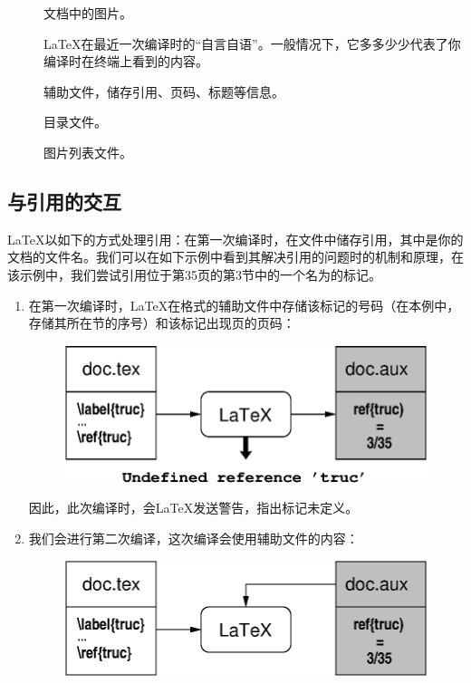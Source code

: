 \begin{description}
  \item[] 文档中的图片。
  \item[] \LaTeX 在最近一次编译时的“自言自语”。一般情况下，它多多少少代表了你编译时在终端上看到的内容。
  \item[] 辅助文件，储存引用、页码、标题等信息。
  \item[] 目录文件。
  \item[] 图片列表文件。
\end{description}

\subsection{与引用的交互}

\LaTeX 以如下的方式处理引用：在第一次编译时，在文件中储存引用，其中是你的文档的文件名。我们可以在如下示例中看到其解决引用的问题时的机制和原理，在该示例中，我们尝试引用位于第35页的第3节中的一个名为的标记。

\begin{enumerate}
  \item 在第一次编译时，\LaTeX 在格式的辅助文件中存储该标记的号码（在本例中，存储其所在节的序号）和该标记出现页的页码：
  
  \begin{figure}[ht]
    \begin{center}
      \includegraphics{img/ref1.eps}
    \end{center}
  \end{figure}

  因此，此次编译时，会\LaTeX 发送警告，指出标记未定义。
  \item 我们会进行第二次编译，这次编译会使用辅助文件的内容：
  \begin{figure}[ht]
    \begin{center}
      \includegraphics{img/ref2.eps}
    \end{center}
  \end{figure}
\end{enumerate}

